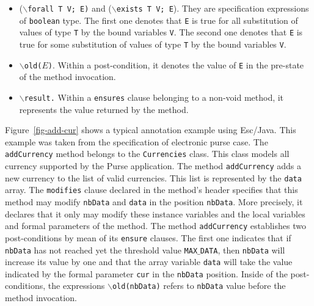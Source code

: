 \documentclass[a4paper]{llncs}
\begin{document}
\begin{itemize}
\item {($\backslash$\texttt{forall T V; E)} and
($\backslash$\texttt{exists T V; E}).}
They are specification expressions of \texttt{boolean} type. The first one
denotes that \texttt{E} is true for all substitution of values
of type \texttt{T} by the bound variables \texttt{V}. The second one
denotes that \texttt{E} is true for some substitution of values of
type \texttt{T} by the bound variables \texttt{V}.

\item{\texttt{$\backslash$old($E$)}.} Within a post-condition, it denotes
the value of \texttt{E} in the pre-state of the method invocation. 

\item {\tt$\backslash$result.} Within a \texttt{ensures} clause
belonging to a non-void method, it represents the value returned by
the method.

\end{itemize}




Figure~\ref{fig-add-cur} shows a typical annotation example using
Esc/Java. This example was taken from the specification of electronic
purse case. The \texttt{addCurrency} method belongs to the
\texttt{Currencies} class. This class models all
currency supported by the Purse application. The method
\texttt{addCurrency} adds a new currency to the list of valid
currencies. This list is represented by the
\texttt{data} array. The \texttt{modifies} clause declared in the
method's header specifies that
this method may modify \texttt{nbData} and
\texttt{data} in the position \texttt{nbData}. More precisely, it
declares that it only may modify these instance variables and the local
variables and formal parameters of the method. The method
\texttt{addCurrency} establishes
two post-conditions by mean of its \texttt{ensure} clauses. The first
one indicates that if \texttt{nbData} has not reached yet the threshold
value \texttt{MAX$\_$DATA}, then \texttt{nbData} will increase its
value by one
and that the array variable \texttt{data} will take the value
indicated by the formal parameter \texttt{cur} in the \texttt{nbData}
position. Inside of the post-conditions, the expressions
\texttt{$\backslash$old(nbData)} refers to \texttt{nbData} value
before the method invocation.
\end{document}
